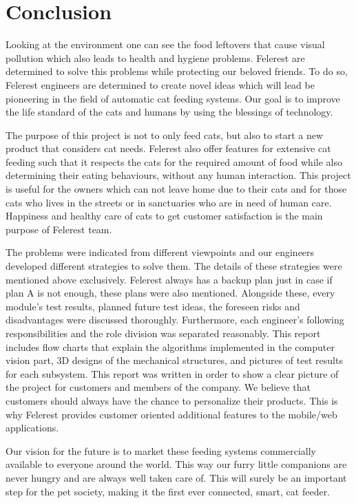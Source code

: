 \section{Conclusion} \label{sec:conc}


Looking at the environment one can see the food leftovers that cause visual pollution which also leads to health and hygiene problems. Felerest are determined to solve this problems while protecting our beloved friends. To do so, Felerest engineers are determined to create novel ideas which will lead be pioneering in the field of automatic cat feeding systems. Our goal is to improve the life standard of the cats and humans by using the blessings of technology. 

The purpose of this project is not to only feed cats, but also to start a new product that considers cat needs. Felerest also offer features for extensive cat feeding such that it respects the cats for the required amount of food while also determining their eating behaviours, without any human interaction. This project is useful for the owners which can not leave home due to their cats and for those cats who lives in the streets or in sanctuaries who are in need of human care. Happiness and healthy care of cats to get customer satisfaction is the main purpose of Felerest team.

The problems were indicated from different viewpoints and our engineers developed different strategies to solve them. The details of these strategies were mentioned above exclusively. Felerest always has a backup plan just in case if plan A is not enough, these plans were also mentioned. Alongside these, every module's test results, planned future test ideas, the foreseen risks and disadvantages were discussed thoroughly. Furthermore, each engineer's following responsibilities and the role division was separated reasonably. This report includes flow charts that explain the algorithms implemented in the computer vision part, 3D designs of the mechanical structures, and pictures of test results for each subsystem. This report was written in order to show a clear picture of the project for customers and members of the company. We believe that customers should always have the chance to personalize their products. This is why Felerest provides customer oriented additional features to the mobile/web applications. 

Our vision for the future is to market these feeding systems commercially available to everyone around the world. This way our furry little companions are never hungry and are always well taken care of. This will surely be an important step for the pet society, making it the first ever connected, smart, cat feeder. 